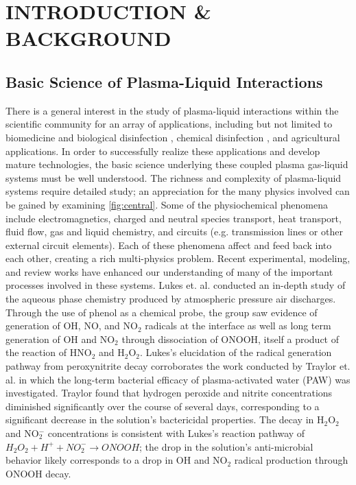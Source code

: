 \chapter{INTRODUCTION \& BACKGROUND}
\label{chap:intro}

\section{Basic Science of Plasma-Liquid Interactions}
\label{sec:intro_plasliq}

There is a general interest in the study of plasma-liquid interactions within the scientific community for an array of applications, including but not limited to biomedicine and biological disinfection \cite{Kong2009b,Laroussi2009,Shimizu2014c,VonWoedtke2014a,VonWoedtke2013a,Joubert2013a}, chemical disinfection \cite{Johnson2006,Locke2006,Theron2008}, and agricultural applications. \cite{Park2013b,Lindsay2014} In order to successfully realize these applications and develop mature technologies, the basic science underlying these coupled plasma gas-liquid systems must be well understood. The richness and complexity of plasma-liquid systems require detailed study; an appreciation for the many physics involved can be gained by examining \cref{fig:central}. Some of the physiochemical phenomena include electromagnetics, charged and neutral species transport, heat transport, fluid flow, gas and liquid chemistry, and circuits (e.g. transmission lines or other external circuit elements). Each of these phenomena affect and feed back into each other, creating a rich multi-physics problem. Recent experimental, modeling, and review works have enhanced our understanding of many of the important processes involved in these systems. Lukes et. al. \cite{Lukes2014b} conducted an in-depth study of the aqueous phase chemistry produced by atmospheric pressure air discharges. Through the use of phenol as a chemical probe, the group saw evidence of generation of OH, NO, and NO$_2$ radicals at the interface as well as long term generation of OH and NO$_2$ through dissociation of ONOOH, itself a product of the reaction of HNO$_2$ and H$_2$O$_2$. Lukes's elucidation of the radical generation pathway from peroxynitrite decay corroborates the work conducted by Traylor et. al. \cite{Traylor2011h} in which the long-term bacterial efficacy of plasma-activated water (PAW) was investigated. Traylor found that hydrogen peroxide and nitrite concentrations diminished significantly over the course of several days, corresponding to a significant decrease in the solution's bactericidal properties. The decay in H$_2$O$_2$ and NO$_2^-$ concentrations is consistent with Lukes's reaction pathway of $H_2O_2 + H^+ + NO_2^- \rightarrow ONOOH$; the drop in the solution's anti-microbial behavior likely corresponds to a drop in OH and NO$_2$ radical production through ONOOH decay.

